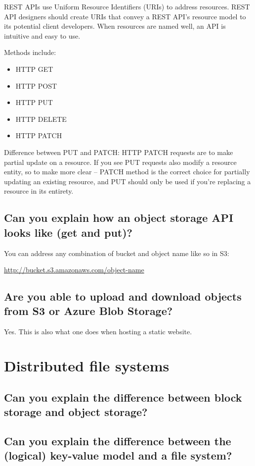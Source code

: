 \documentclass{article}
\begin{document}
REST APIs use Uniform Resource Identifiers (URIs) to address resources. REST API designers should create URIs that convey a REST API's resource model to its potential client developers. When resources are named well, an API is intuitive and easy to use.

Methods include:
\begin{itemize}
\item HTTP GET
\item HTTP POST
\item HTTP PUT
\item HTTP DELETE
\item HTTP PATCH
\end{itemize}

Difference between PUT and PATCH: HTTP PATCH requests are to make partial update on a resource. If you see PUT requests also modify a resource entity, so to make more clear – PATCH method is the correct choice for partially updating an existing resource, and PUT should only be used if you’re replacing a resource in its entirety.

\subsection{Can you explain how an object storage API looks like (get and put)?}

You can address any combination of bucket and object name like so in S3:

\url{http://bucket.s3.amazonaws.com/object-name}

\subsection{Are you able to upload and download objects from S3 or Azure Blob Storage?}

Yes. This is also what one does when hosting a static website.

\pagebreak

\section{Distributed file systems}
\subsection{Can you explain the difference between block storage and object storage?}
\subsection{Can you explain the difference between the (logical) key-value model and a file system?}
\end{document}
